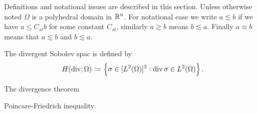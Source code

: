 \documentclass[thesis.tex]{subfiles}
\begin{document}
Definitions and notational issues are described in this section. Unless otherwise noted $\Omega$ is a polyhedral domain in $\mathbb{R}^n$.
For notational ease we write $a \lesssim b$ if we have $a \leq C_{st} b$ for some constant $C_{st}$, similarly $a \gtrsim b$ means $b \lesssim a$. Finally $a \approx b$ means that $a \lesssim b$ and $b \lesssim a$.

\begin{defn}
  \label{def:hdiv}
The divergent Sobolev spac is defined by
\[
  H(\operatorname{div}; \Omega) := \set{ \sigma \in [L^2(\Omega)]^2 : \operatorname{div}\sigma \in L^2(\Omega)}.
  \]
\end{defn}

\begin{thm}
  \label{thm:divergence}
The divergence theorem
\end{thm}
\begin{thm}
  \label{thm:poincare}
  Poincare-Friedrich inequality.
\end{thm}
\end{document}
